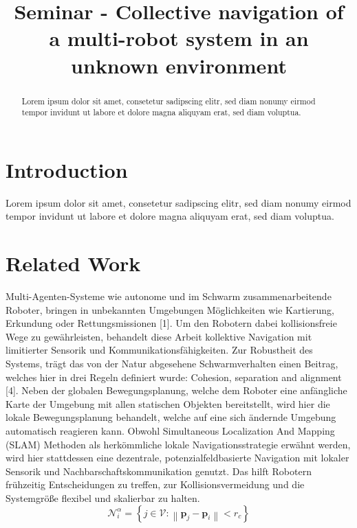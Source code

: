 \documentclass[conference]{IEEEtran}
\begin{document}
\title{Seminar - Collective navigation of a multi-robot system in an unknown environment}
\author{
}

\maketitle


\begin{abstract}
Lorem ipsum dolor sit amet, consetetur sadipscing elitr, sed diam nonumy eirmod tempor invidunt ut labore et dolore magna aliquyam erat, sed diam voluptua.
\end{abstract}


\section{Introduction}
Lorem ipsum dolor sit amet, consetetur sadipscing elitr, sed diam nonumy eirmod tempor invidunt ut labore et dolore magna aliquyam erat, sed diam voluptua.


\section{Related Work}
Multi-Agenten-Systeme wie autonome und im Schwarm zusammenarbeitende Roboter, bringen in unbekannten Umgebungen Möglichkeiten wie 
Kartierung, Erkundung oder Rettungsmissionen [1]. Um den Robotern dabei kollisionsfreie Wege zu gewährleisten, behandelt diese Arbeit 
kollektive Navigation mit limitierter Sensorik und Kommunikationsfähigkeiten.
Zur Robustheit des Systems, trägt das von der Natur abgesehene Schwarmverhalten einen Beitrag, welches hier in drei Regeln definiert 
wurde: Cohesion, separation and alignment [4].
Neben der globalen Bewegungsplanung, welche dem Roboter eine anfängliche Karte der Umgebung mit allen statischen Objekten bereitstellt, 
wird hier die lokale Bewegungsplanung behandelt, welche auf eine sich ändernde Umgebung automatisch reagieren kann.
Obwohl Simultaneous Localization And Mapping (SLAM) Methoden als herkömmliche lokale Navigationsstrategie erwähnt werden, wird hier 
stattdessen eine dezentrale, potenzialfeldbasierte Navigation mit lokaler Sensorik und Nachbarschaftskommunikation genutzt. Das hilft 
Robotern frühzeitig Entscheidungen zu treffen, zur Kollisionsvermeidung und die Systemgröße flexibel und skalierbar zu halten. 
\[
\mathcal{N}_i^{\alpha} = \left\{ j \in \mathcal{V} : \left\| \mathbf{p}_j - \mathbf{p}_i \right\| < r_c \right\}
\]
\end{document}
